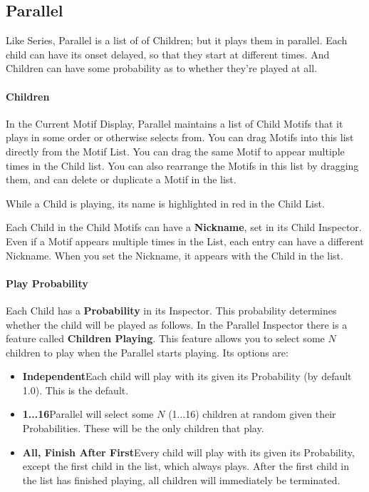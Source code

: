 \documentclass[twoside,10pt]{article}
\begin{document}
\subsection{Parallel}

Like Series, Parallel is a list of of Children; but it plays them in parallel.  Each child can have its onset delayed, so that they start at different times.  And Children can have some probability as to whether they're played at all.

\paragraph{Children}

In the Current Motif Display, Parallel maintains a list of Child Motifs that it plays in some order or otherwise selects from.  You can drag Motifs into this list directly from the Motif List.  You can drag the same Motif to appear multiple times in the Child list.  You can also rearrange the Motifs in this list by dragging them, and can delete or duplicate a Motif in the list.

While a Child is playing, its name is highlighted in red in the Child List.

Each Child in the Child Motifs can have a {\bf Nickname}, set in its Child Inspector.  Even if a Motif appears multiple times in the List, each entry can have a different Nickname.  When you set the Nickname, it appears with the Child in the list.

\paragraph{Play Probability}

Each Child has a {\bf Probability} in its Inspector.  This probability determines whether the child will be played as follows.  In the Parallel Inspector there is a feature called {\bf Children Playing}.  This feature allows you to select some \(N\) children to play when the Parallel starts playing.  Its options are:

\begin{itemize}
\item {\bf Independent}\quad Each child will play with its given its Probability (by default 1.0).  This is the default.
\item {\bf 1...16}\quad Parallel will select some \(N\) (1...16) children at random given their Probabilities.  These will be the only children that play.
\item {\bf All, Finish After First}\quad Every child will play with its given its Probability, except the first child in the list, which always plays.  After the first child in the list has finished playing, all children will immediately be terminated.
\end{itemize}
\end{document}
